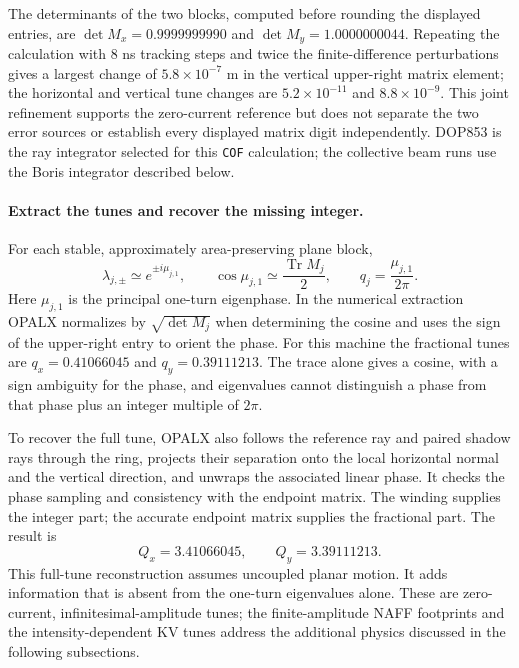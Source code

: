 The determinants of the two blocks, computed before rounding the displayed
entries, are $\det M_x=0.9999999990$ and $\det M_y=1.0000000044$.
Repeating the calculation with 8 ns tracking steps and twice the
finite-difference perturbations gives a largest change of
$5.8\times10^{-7}$ m in the vertical upper-right matrix element; the
horizontal and vertical tune changes are
$5.2\times10^{-11}$ and $8.8\times10^{-9}$. This joint refinement supports
the zero-current reference but does not separate the two error sources or
establish every displayed matrix digit independently. DOP853 is the ray
integrator selected for this \texttt{COF} calculation; the collective beam
runs use the Boris integrator described below.

\paragraph{Extract the tunes and recover the missing integer.}
For each stable, approximately area-preserving plane block,
\begin{equation}
 \lambda_{j,\pm}\simeq e^{\pm i\mu_{j,1}},\qquad
 \cos\mu_{j,1}\simeq\frac{\operatorname{Tr}M_j}{2},\qquad
 q_j=\frac{\mu_{j,1}}{2\pi}.
 \label{eq:cof-eigenphase}
\end{equation}
Here $\mu_{j,1}$ is the principal one-turn eigenphase. In the numerical
extraction OPALX normalizes by $\sqrt{\det M_j}$ when determining the cosine
and uses the sign of the upper-right entry to orient the phase. For this
machine the fractional tunes are $q_x=0.41066045$ and $q_y=0.39111213$.
The trace alone gives a cosine, with a sign ambiguity for the phase, and
eigenvalues cannot distinguish a phase from that phase plus an integer
multiple of $2\pi$.

To recover the full tune, OPALX also follows the reference ray and paired
shadow rays through the ring, projects their separation onto the local
horizontal normal and the vertical direction, and unwraps the associated
linear phase. It checks the phase sampling and consistency with the endpoint
matrix. The winding supplies the integer part; the accurate endpoint matrix
supplies the fractional part. The result is
\begin{equation}
 \boxed{Q_x=3.41066045,\qquad Q_y=3.39111213.}
 \label{eq:cof-full-tunes}
\end{equation}
This full-tune reconstruction assumes uncoupled planar motion. It adds
information that is absent from the one-turn eigenvalues alone. These are
zero-current, infinitesimal-amplitude tunes; the finite-amplitude NAFF
footprints and the intensity-dependent KV tunes address the additional
physics discussed in the following subsections.
